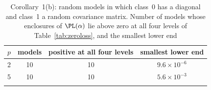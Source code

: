 \begin{table}[t]
\caption{Corollary~1(b): random models in which class~0 has a diagonal and class~1 a random covariance matrix. Number of models whose enclosures of $\PL(\alpha)$ lie above zero at all four levels of Table~\ref{tab:zeroloss}, and the smallest lower end}\label{tab:onediag}
\small
\begin{tabular*}{\textwidth}{@{\extracolsep\fill}cccc@{}}
\toprule
$p$ & models & positive at all four levels & smallest lower end\\
\midrule
2 & 10 & 10 & $9.6\times10^{-6}$\\
5 & 10 & 10 & $5.6\times10^{-3}$\\
\botrule
\end{tabular*}
\end{table}
